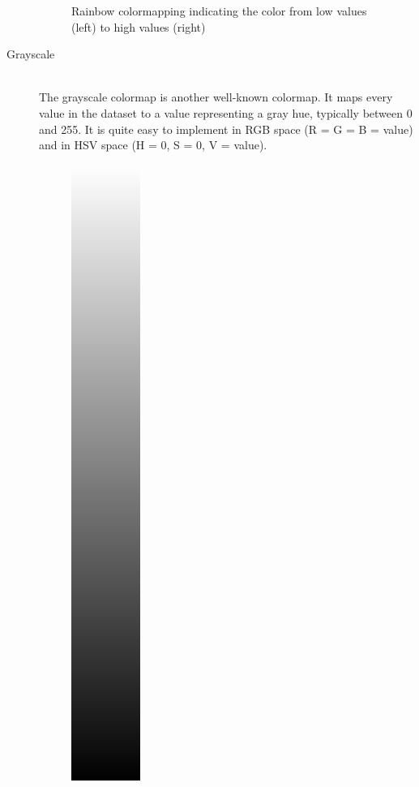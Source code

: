 \begin{description}
\begin{figure}[htb]
			  \caption{Rainbow colormapping indicating the color from low values (left) to high values (right)}
			\end{figure}
			\item[Grayscale] ~\\ 
			The grayscale colormap is another well-known colormap. 
			It maps every value in the dataset to a value representing a gray hue, typically between 0 and 255. 
			It is quite easy to implement in RGB space (R = G = B = value) and in HSV space (H = 0, S = 0, V = value).
			\begin{figure}[htb]
			  \centering
			  \includegraphics[angle=270, width=\linewidth, totalheight=1em, frame]{./content/pictures/black_white.png}

\end{figure}
\end{description}
